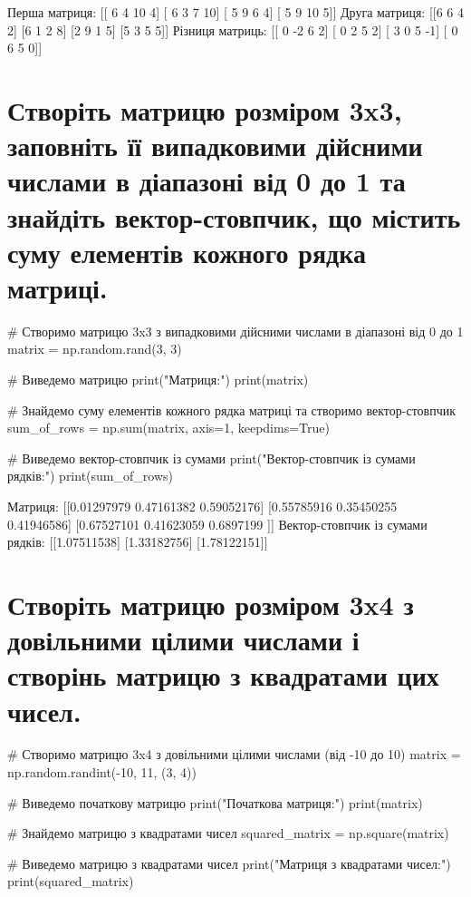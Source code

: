 \documentclass[]{article}
\newcounter{pythoncode}
\begin{document}
\begin{out}
	Перша матриця:
	[[ 6  4 10  4]
	 [ 6  3  7 10]
	 [ 5  9  6  4]
	 [ 5  9 10  5]]
	Друга матриця:
	[[6 6 4 2]
	 [6 1 2 8]
	 [2 9 1 5]
	 [5 3 5 5]]
	Різниця матриць:
	[[ 0 -2  6  2]
	 [ 0  2  5  2]
	 [ 3  0  5 -1]
	 [ 0  6  5  0]]
\end{out}

\section{Створіть матрицю розміром 3x3, заповніть її випадковими дійсними числами в діапазоні від 0 до 1 та знайдіть вектор-стовпчик, що містить суму елементів кожного рядка матриці.}

\begin{pythoncode}
    # Створимо матрицю 3x3 з випадковими дійсними числами в діапазоні від 0 до 1
    matrix = np.random.rand(3, 3)

    # Виведемо матрицю
    print("Матриця:")
    print(matrix)

    # Знайдемо суму елементів кожного рядка матриці та створимо вектор-стовпчик
    sum_of_rows = np.sum(matrix, axis=1, keepdims=True)

    # Виведемо вектор-стовпчик із сумами
    print("Вектор-стовпчик із сумами рядків:")
    print(sum_of_rows)
\end{pythoncode}

\begin{out}
	Матриця:
	[[0.01297979 0.47161382 0.59052176]
	 [0.55785916 0.35450255 0.41946586]
	 [0.67527101 0.41623059 0.6897199 ]]
	Вектор-стовпчик із сумами рядків:
	[[1.07511538]
	 [1.33182756]
	 [1.78122151]]
\end{out}

\section{Створіть матрицю розміром 3x4 з довільними цілими числами і створінь матрицю з квадратами цих чисел.}

\begin{pythoncode}
# Створимо матрицю 3x4 з довільними цілими числами (від -10 до 10)
matrix = np.random.randint(-10, 11, (3, 4))

# Виведемо початкову матрицю
print("Початкова матриця:")
print(matrix)

# Знайдемо матрицю з квадратами чисел
squared_matrix = np.square(matrix)

# Виведемо матрицю з квадратами чисел
print("Матриця з квадратами чисел:")
print(squared_matrix)
\end{pythoncode}
\end{document}
